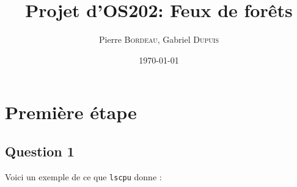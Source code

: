\documentclass[a4paper, 12pt]{report}
\title{Projet d'OS202: Feux de forêts}
\author{Pierre \textsc{Bordeau}, Gabriel \textsc{Dupuis}}
\date{\today}
\begin{document}
\maketitle
\newpage
\tableofcontents
\newpage

\setlength{\parskip}{0.5\baselineskip plus 0.3\baselineskip minus 0.2\baselineskip} %
\makeatletter
\renewcommand\paragraph{\@startsection{paragraph}{4}{\z@}{0pt}{-1em}{\normalfont\normalsize\bfseries}}
\makeatother

\section{Première étape}
\subsection{Question 1}

Voici un exemple de ce que \texttt{lscpu} donne :
\end{document}
